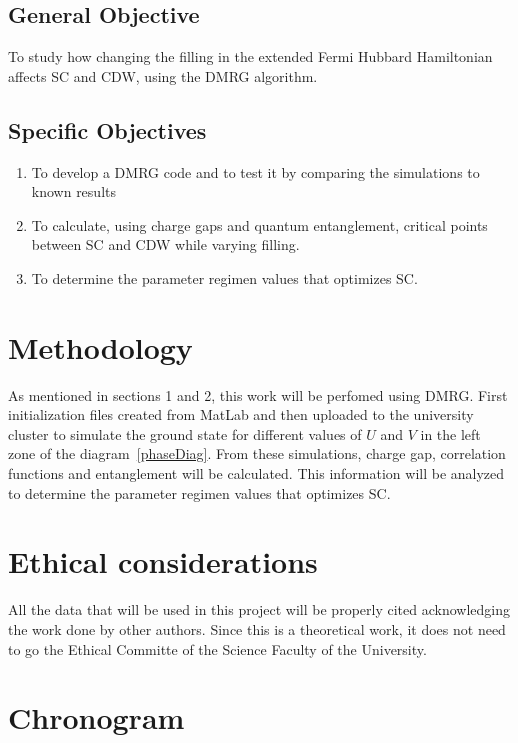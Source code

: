 \documentclass{article}
\begin{document}
\subsection{General Objective}

To study how changing the filling in the extended Fermi Hubbard Hamiltonian affects SC and CDW, using the DMRG algorithm. 

\subsection{Specific Objectives}

\begin{enumerate}
    \item To develop a DMRG code and to test it by comparing the simulations to known results
    \item  To calculate, using charge gaps and quantum entanglement, critical points between SC and CDW while varying filling.
    \item To determine the parameter regimen values that optimizes SC.
\end{enumerate}

\section{Methodology}

As mentioned in sections 1 and 2, this work will be perfomed using DMRG. First initialization files created from MatLab and then uploaded to the university cluster to simulate the ground state for different values of $U$ and $V$ in the left zone of the diagram~\ref{phaseDiag}. From these simulations, charge gap, correlation functions and entanglement will be calculated. This information will be analyzed to determine the parameter regimen values that optimizes SC.

\section{Ethical considerations}

All the data that will be used in this project will be properly cited acknowledging the work done by other authors. Since this is a theoretical work, it does not need to go the Ethical Committe of the Science Faculty of the University.

\section{Chronogram}
\end{document}
